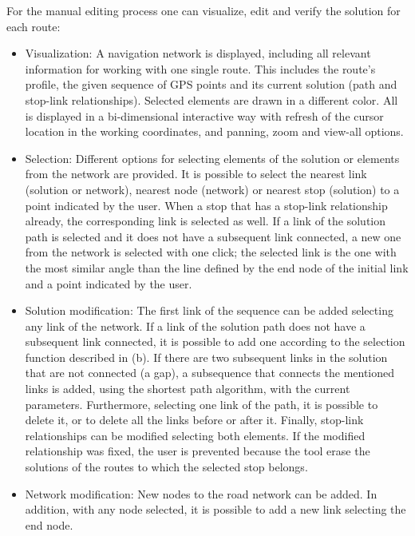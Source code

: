 \documentclass[a4paper,11pt]{report}
\begin{document}
For the manual editing process one can visualize, edit and verify the solution for each route:
\begin{itemize}
	\item Visualization: A navigation network is displayed, including all  relevant information for working with one single route. This includes  the route’s profile, the given sequence of GPS points and its current  solution (path and stop-link relationships). Selected elements are drawn  in a different color. All is displayed in a bi-dimensional interactive  way with refresh of the cursor location in the working coordinates, and  panning,  zoom and view-all options.
	\item Selection: Different options for selecting elements of the solution  or elements from the network are provided. It is possible to select the  nearest link (solution or network), nearest node (network) or nearest  stop (solution) to a point indicated by the user. When a stop that has a  stop-link relationship already, the corresponding link is selected as  well. If a link of the solution path is selected and it does not have a  subsequent link connected, a new one from the network is selected with  one click; the selected link is the one with the most similar angle than  the line defined by the end node of the initial link and a point  indicated by the user.
	\item Solution modification: The first link of the sequence can be added  selecting any link of the network. If a link of the solution path does  not have a subsequent link connected, it is possible to add one  according to the selection function described in (b). If there are two  subsequent links in the solution that are not connected (a gap), a  subsequence that connects the mentioned links is added, using the  shortest path algorithm, with the current parameters. Furthermore,  selecting one link of the path, it is possible to delete it, or to  delete all the links before or after it. Finally, stop-link  relationships can be modified selecting both elements. If the modified  relationship was fixed, the user  is prevented because the tool erase  the solutions of the routes to which the selected stop belongs.
	\item Network modification: New nodes to the road network can be added. In  addition, with any node selected, it is possible to add a new link  selecting the end node.
\end{itemize}
\end{document}
